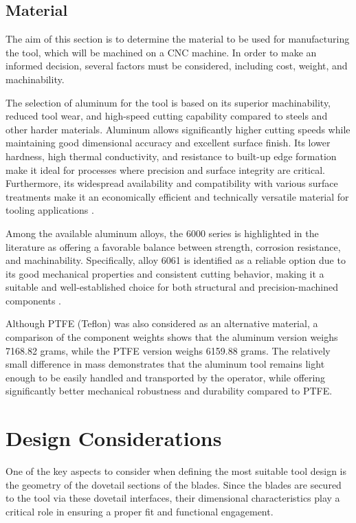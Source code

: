 \subsection{Material}

The aim of this section is to determine the material to be used for manufacturing the tool, which will be machined on a CNC machine. In order to make an informed decision, several factors must be considered, including cost, weight, and machinability.

The selection of aluminum for the tool is based on its superior machinability, reduced tool wear, and high-speed cutting capability compared to steels and other harder materials. 
Aluminum allows significantly higher cutting speeds while maintaining good dimensional accuracy and excellent surface finish. Its lower hardness, high thermal conductivity, and resistance to built-up edge formation make it ideal for processes where precision and surface integrity are critical. 
Furthermore, its widespread availability and compatibility with various surface treatments make it an economically efficient and technically versatile material for tooling applications \cite{Rahman2023AluminumMachinability}.

Among the available aluminum alloys, the 6000 series is highlighted in the literature as offering a favorable balance between strength, corrosion resistance, and machinability. 
Specifically, alloy 6061 is identified as a reliable option due to its good mechanical properties and consistent cutting behavior, making it a suitable and well-established choice for both structural and precision-machined components \cite{Rahman2023AluminumMachinability}.

Although PTFE (Teflon) was also considered as an alternative material, a comparison of the component weights shows that the aluminum version weighs 7168.82 grams, while the PTFE version weighs 6159.88 grams. 
The relatively small difference in mass demonstrates that the aluminum tool remains light enough to be easily handled and transported by the operator, while offering significantly better mechanical robustness and durability compared to PTFE.


\section{Design Considerations}

One of the key aspects to consider when defining the most suitable tool design is the geometry of the dovetail sections of the blades. 
Since the blades are secured to the tool via these dovetail interfaces, their dimensional characteristics play a critical role in ensuring a proper fit and functional engagement.

